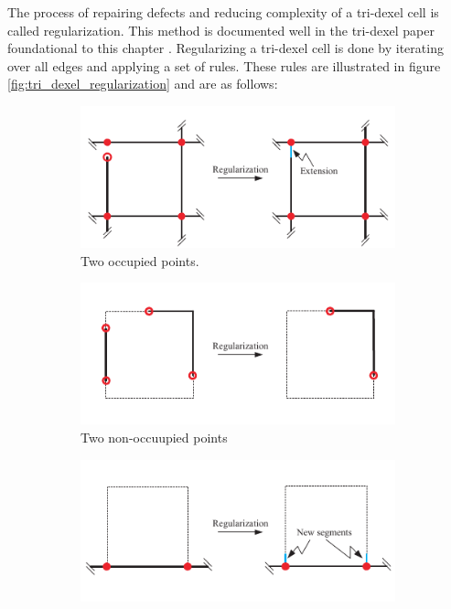 The process of repairing defects and reducing complexity of a tri-dexel cell is called regularization.
This method is documented well in the tri-dexel paper foundational to this chapter \cite{tridexel_reconstruction}.
Regularizing a tri-dexel cell is done by iterating over all edges and applying a set of rules.
These rules are illustrated in figure \ref{fig:tri_dexel_regularization} and are as follows:

\begin{figure}[h]
	\centering
	\begin{subfigure}[t]{0.45\textwidth}
		\centering
		\includegraphics[width=\textwidth]{images/tri_dexel_regularization_1}
		\caption{Two occupied points.}
		\label{fig:tri_dexel_regularization_1}
	\end{subfigure}
	\begin{subfigure}[t]{0.45\textwidth}
		\centering
		\includegraphics[width=\textwidth]{images/tri_dexel_regularization_2}
		\caption{Two non-occuupied points}
		\label{fig:tri_dexel_regularization_2}
	\end{subfigure}
	\begin{subfigure}[t]{0.45\textwidth}
		\centering
		\includegraphics[width=\textwidth]{images/tri_dexel_regularization_3}

\end{subfigure}
\end{figure}
